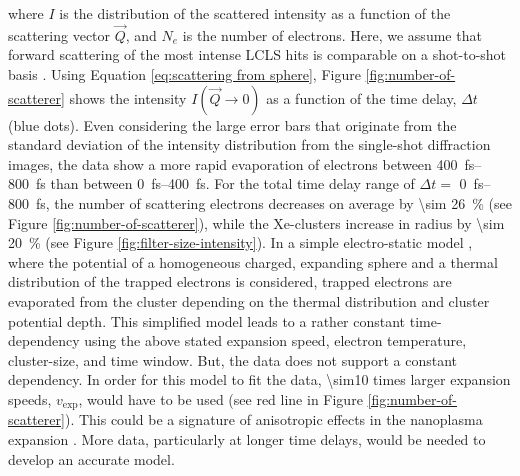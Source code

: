 where $I$ is the distribution of the scattered intensity as a function of the scattering vector $\vec{Q}$, and $N_{e}$ is the number of electrons. Here, we assume that forward scattering of the most intense LCLS hits is comparable on a shot-to-shot basis \cite{Gorkhover-2012-PRL}. Using Equation \eqref{eq:scattering from sphere}, Figure \ref{fig:number-of-scatterer} shows the intensity $I\left(\vec{Q}\rightarrow 0\right)$ as a function of the time delay, $\Delta t$ (blue dots).
Even considering the large error bars that originate from the standard deviation of the intensity distribution from the single-shot diffraction images, the data show a more rapid evaporation of electrons between \SIrange{400}{800}{\femto\second} than between \SIrange{0}{400}{\femto\second}. For the total time delay range of $\Delta t=$ \SIrange{0}{800}{\femto\second}, the number of scattering electrons decreases on average by \SI{\sim 26}{\percent} (see Figure \ref{fig:number-of-scatterer}), while the Xe-clusters increase in radius by \SI{\sim 20}{\percent} (see Figure \ref{fig:filter-size-intensity}). In a simple electro-static model \cite{Arbeiter-2010-PRA,Ditmire-1996-PRA}, where the potential of a homogeneous charged, expanding sphere and a thermal distribution of the trapped electrons is considered, trapped electrons are evaporated from the cluster depending on the thermal distribution and cluster potential depth. This simplified model leads to a rather constant time-dependency using the above stated expansion speed, electron temperature, cluster-size, and time window. But, the data does not support a constant dependency. In order for this model to fit the data, \num{\sim10} times larger expansion speeds, $v_{\text{exp}}$, would have to be used (see red line in Figure \ref{fig:number-of-scatterer}). This could be a signature of anisotropic effects in the nanoplasma expansion \cite{Peltz-2014-PRL,Mikaberidze-2009-PRL}. More data, particularly at longer time delays, would be needed to develop an accurate model.\\[1\baselineskip]
